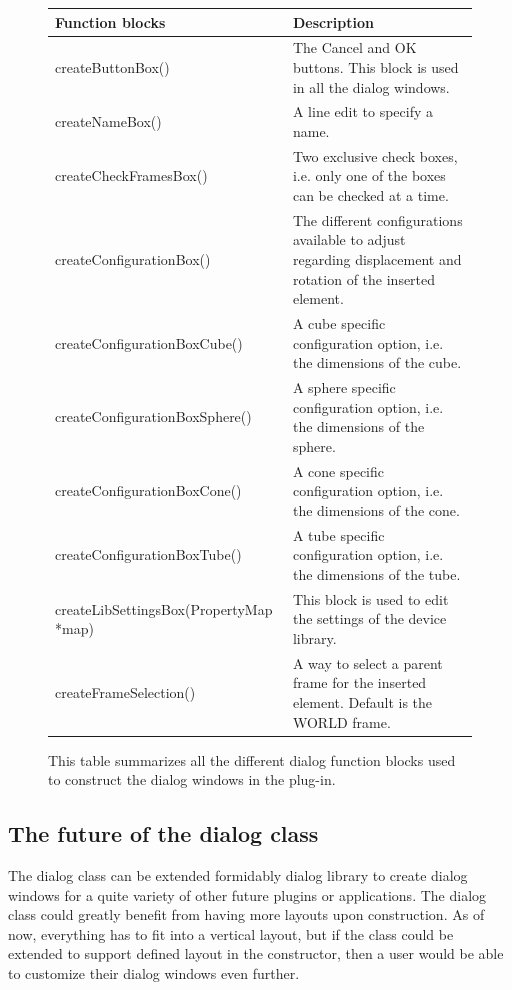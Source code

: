 \begin{figure} [h] %
\centering
\begin{center}
  \begin{tabular}{ | p{6cm} | p{7cm} |}
    \hline
    \textbf{Function blocks} 	   &   \textbf{Description}  \\ \hline
    createButtonBox()			   &   The Cancel and OK buttons. This block is used in all the dialog windows.   		\\ \hline
    createNameBox() 			   &   A line edit to specify a name.   		\\ \hline
    createCheckFramesBox()		   &   Two exclusive check boxes, i.e. only one of the boxes can be checked at a time.		\\ \hline
    createConfigurationBox() 	   &   The different configurations available to adjust regarding displacement and rotation of the inserted element. 		\\ \hline
	createConfigurationBoxCube()   &   A cube specific configuration option, i.e. the dimensions of the cube.  	\\ \hline	    
	createConfigurationBoxSphere() &   A sphere specific configuration option, i.e. the dimensions of the sphere. 	\\ \hline	
	createConfigurationBoxCone()   &   A cone specific configuration option, i.e. the dimensions of the cone.  	\\ \hline	
    createConfigurationBoxTube()   &   A tube specific configuration option, i.e. the dimensions of the tube.  	\\ \hline	
	createLibSettingsBox(PropertyMap *map)		   &   This block is used to edit the settings of the device library.    	\\ \hline	 
	createFrameSelection()		   &   A way to select a parent frame for the inserted element. Default is the WORLD frame.		\\
    \hline
  \end{tabular}
\end{center}
\caption{This table summarizes all the different dialog function blocks used to construct the dialog windows in the plug-in.}
\label{fig:dialogBlocks} 
\end{figure}

\subsection{The future of the dialog class}
The dialog class can be extended formidably dialog library to create dialog windows for a quite variety of other future plugins or applications. The dialog class could greatly benefit from having more layouts upon construction. As of now, everything has to fit into a vertical layout, but if the class could be extended to support defined layout in the constructor, then a user would be able to customize their dialog windows even further. 

